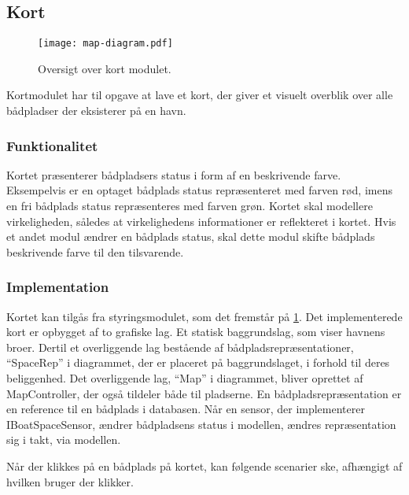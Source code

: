 \subsection{Kort}
\label{sub:kort}

\begin{figure}
  \centering
  \texttt{[image: map-diagram.pdf]}
  \caption{Oversigt over kort modulet.}
  \label{fig:map_diagram}
\end{figure}

Kortmodulet har til opgave at lave et kort, der giver et visuelt overblik over alle bådpladser der eksisterer på en havn.

\subsubsection{Funktionalitet}
\label{ssub:kort_funktionalitet}

Kortet præsenterer bådpladsers status i form af en beskrivende farve. Eksempelvis er en optaget bådplads status repræsenteret med farven rød, imens en fri bådplads status repræsenteres med farven grøn. Kortet skal modellere virkeligheden, således at virkelighedens informationer er reflekteret i kortet. Hvis et andet modul ændrer en bådplads status, skal dette modul skifte bådplads beskrivende farve til den tilsvarende.

\subsubsection{Implementation}
\label{ssub:kort_implementation}

Kortet kan tilgås fra styringsmodulet, som det fremstår på \cref{fig:map_diagram}. Det implementerede kort er opbygget af to grafiske lag. Et statisk baggrundslag, som viser havnens broer. Dertil et overliggende lag bestående af bådpladsrepræsentationer, \enquote{SpaceRep} i diagrammet, der er placeret på baggrundslaget, i forhold til deres beliggenhed. Det overliggende lag, \enquote{Map} i diagrammet, bliver oprettet af MapController, der også tildeler både til pladserne. En bådpladsrepræsentation er en reference til en bådplads i databasen. Når en sensor, der implementerer IBoatSpaceSensor, ændrer bådpladsens status i modellen, ændres repræsentation sig i takt, via modellen.

Når der klikkes på en bådplads på kortet, kan følgende scenarier ske, afhængigt af hvilken bruger der klikker.

